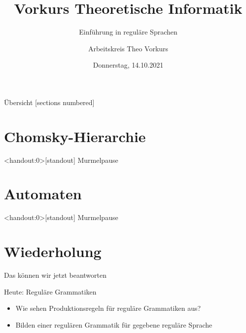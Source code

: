 

\title{Vorkurs Theoretische Informatik}
\subtitle{Einführung in reguläre Sprachen}
\date{Donnerstag, 14.10.2021}
\author{Arbeitskreis  Theo Vorkurs}



\maketitle

\begin{frame}[fragile]{Übersicht}
  [sections numbered]
  \tableofcontents%
\end{frame}


\section{Chomsky-Hierarchie}



\begin{frame}<handout:0>[standout]
  Murmelpause
\end{frame}

\section{Automaten}



\begin{frame}<handout:0>[standout]
  Murmelpause
\end{frame}





\section{Wiederholung}


\begin{frame}[fragile]{Das können wir jetzt beantworten}
  \begin{alertblock}{Heute: Reguläre Grammatiken}
    \begin{itemize}
      \item Wie sehen Produktionsregeln für reguläre Grammatiken aus?
      \item Bilden einer regulären Grammatik für gegebene reguläre Sprache
    \end{itemize}
  \end{alertblock}
\end{frame}

